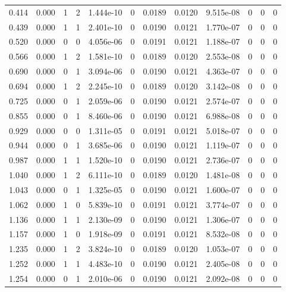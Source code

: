 \documentclass[preview]{standalone}
\begin{document}
{{\begin{tabular}{L{1.2cm}C{1.2cm} C{0.3cm}C{0.5cm} C{1.4cm}C{1.4cm} C{1.4cm}C{1.4cm} C{1.6cm}C{1.6cm} C{1.6cm}C{1.6cm}}
  0.414  &  0.000  & 1     &  2 &  1.444e-10  & 0  &  0.0189&   0.0120& 9.515e-08 & 0   &  0 & 0  \\ 
  0.439  &  0.000  & 1     &  1 &  2.401e-10  & 0  &  0.0190&   0.0121& 1.770e-07 & 0   &  0 & 0  \\ 
  0.520  &  0.000  & 0     &  0 &  4.056e-06  & 0  &  0.0191&   0.0121& 1.188e-07 & 0   &  0 & 0  \\ 
  0.566  &  0.000  & 1     &  2 &  1.581e-10  & 0  &  0.0189&   0.0120& 2.553e-08 & 0   &  0 & 0  \\ 
  0.690  &  0.000  & 0     &  1 &  3.094e-06  & 0  &  0.0190&   0.0121& 4.363e-07 & 0   &  0 & 0  \\ 
  0.694  &  0.000  & 1     &  2 &  2.245e-10  & 0  &  0.0189&   0.0120& 3.142e-08 & 0   &  0 & 0  \\ 
  0.725  &  0.000  & 0     &  1 &  2.059e-06  & 0  &  0.0190&   0.0121& 2.574e-07 & 0   &  0 & 0  \\ 
  0.855  &  0.000  & 0     &  1 &  8.460e-06  & 0  &  0.0190&   0.0121& 6.988e-08 & 0   &  0 & 0  \\ 
  0.929  &  0.000  & 0     &  0 &  1.311e-05  & 0  &  0.0191&   0.0121& 5.018e-07 & 0   &  0 & 0  \\ 
  0.944  &  0.000  & 0     &  1 &  3.685e-06  & 0  &  0.0190&   0.0121& 1.119e-07 & 0   &  0 & 0  \\ 
  0.987  &  0.000  & 1     &  1 &  1.520e-10  & 0  &  0.0190&   0.0121& 2.736e-07 & 0   &  0 & 0  \\ 
  1.040  &  0.000  & 1     &  2 &  6.111e-10  & 0  &  0.0189&   0.0120& 1.481e-08 & 0   &  0 & 0  \\ 
  1.043  &  0.000  & 0     &  1 &  1.325e-05  & 0  &  0.0190&   0.0121& 1.600e-07 & 0   &  0 & 0  \\ 
  1.062  &  0.000  & 1     &  0 &  5.839e-10  & 0  &  0.0191&   0.0121& 3.774e-07 & 0   &  0 & 0  \\ 
  1.136  &  0.000  & 1     &  1 &  2.130e-09  & 0  &  0.0190&   0.0121& 1.306e-07 & 0   &  0 & 0  \\ 
  1.157  &  0.000  & 1     &  0 &  1.918e-09  & 0  &  0.0191&   0.0121& 8.532e-08 & 0   &  0 & 0  \\ 
  1.235  &  0.000  & 1     &  2 &  3.824e-10  & 0  &  0.0189&   0.0120& 1.053e-07 & 0   &  0 & 0  \\ 
  1.252  &  0.000  & 1     &  1 &  4.483e-10  & 0  &  0.0190&   0.0121& 2.405e-08 & 0   &  0 & 0  \\ 
  1.254  &  0.000  & 0     &  1 &  2.010e-06  & 0  &  0.0190&   0.0121& 2.092e-08 & 0   &  0 & 0  \\ 

\end{tabular}}}
\end{document}
